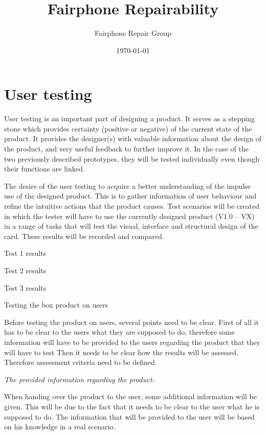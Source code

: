 \documentclass[final,a4paper]{report} %
\author{Fairphone Repair Group}
\title{Fairphone Repairability}
\date{\today}
\begin{document}
	\section{User testing}
	\label{sec:packaging-user-testing}
	User testing is an important part of designing a product. It serves as a stepping stone which provides certainty (positive or negative) of the current state of the product. It provides the designer(s) with valuable information about the design of the product, and very useful feedback to further improve it. In the case of the two previously described prototypes, they will be tested individually even though their functions are linked.
	
	The desire of the user testing to acquire a better understanding of the impulse use of the designed product. This is to gather information of user behaviour and refine the intuitive actions that the product causes. Test scenarios will be created in which the tester will have to use the currently designed product (V1.0 – VX) in a range of tasks that will test the visual, interface and structural design of the card. These results will be recorded and compared.
	
	Test 1 results
	
	Test 2 results
	
	Test 3 results
	
	Testing the box product on users
	
	Before testing the product on users, several points need to be clear.
	First of all it has to be clear to the users what they are supposed to do, therefore some information will have to be provided to the users regarding the product that they will have to test
	Then it needs to be clear how the results will be assessed. Therefore assessment criteria need to be defined. 
	
	\textit{The provided information regarding the product:}
	
	When handing over the product to the user, some additional information will be given. This will be due to the fact that it needs to be clear to the user what he is supposed to do. The information that will be provided to the user will be based on his knowledge in a real scenario.
	
\end{document}
